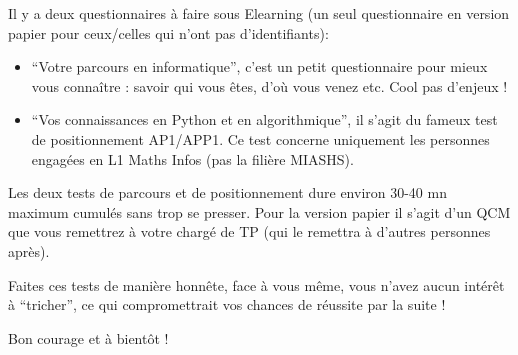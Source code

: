 \documentclass{article}
\begin{document}
Il y a deux questionnaires à faire sous Elearning (un seul questionnaire en version papier pour ceux/celles qui n'ont pas d'identifiants): 

\begin{itemize}
\item
``Votre parcours en informatique'', c'est un petit questionnaire pour mieux vous connaître : savoir qui vous êtes, d'où vous venez etc. Cool pas d'enjeux !
\item 
``Vos connaissances en Python et en algorithmique'', il s'agit du fameux test de positionnement AP1/APP1. Ce test concerne uniquement les personnes engagées en L1 Maths Infos (pas la filière MIASHS).
\end{itemize}

Les deux  tests de parcours et de positionnement dure environ 30-40 mn maximum cumulés sans trop se presser. Pour la version papier il s'agit d'un QCM que vous remettrez à votre chargé de TP (qui le remettra à d'autres personnes après). 

Faites ces tests de manière honnête, face à vous même, vous n'avez aucun intérêt à ``tricher'', ce qui compromettrait vos chances de réussite par la suite !

Bon courage et à bientôt !
\end{document}
